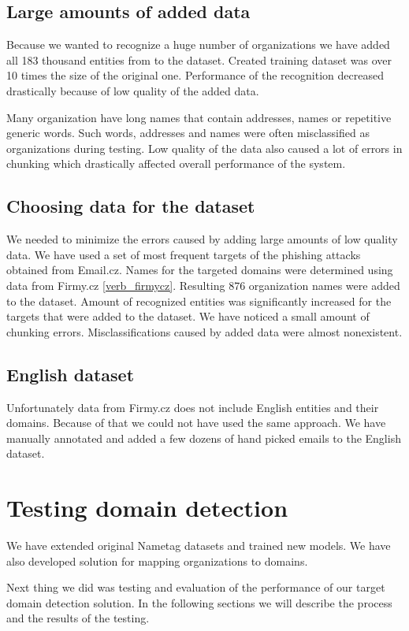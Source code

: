 \documentclass[thesis=B,english]{FITthesis}[2012/10/20]
\begin{document}
\subsection{Large amounts of added data}
Because we wanted to recognize a huge number of organizations we have added all 183 thousand entities from \cite{opendata_orgs} to the dataset.
Created training dataset was over 10 times the size of the original one.
Performance of the recognition decreased drastically because of low quality of the added data.

Many organization have long names that contain addresses, names or repetitive generic words. 
Such words, addresses and names were often misclassified as organizations during testing.
Low quality of the data also caused a lot of errors in chunking which drastically affected overall performance of the system.


\subsection{Choosing data for the dataset}
We needed to minimize the errors caused by adding large amounts of low quality data.
We have used a set of most frequent targets of the phishing attacks obtained from Email.cz.
Names for the targeted domains were determined using data from Firmy.cz \ref{verb_firmycz}.
Resulting 876 organization names were added to the dataset. 
Amount of recognized entities was significantly increased for the targets that were added to the dataset.
We have noticed a small amount of chunking errors. Misclassifications caused by added data were almost nonexistent. 

\subsection{English dataset}
Unfortunately data from Firmy.cz does not include English entities and their domains.
Because of that we could not have used the same approach.
We have manually annotated and added a few dozens of hand picked emails to the English dataset.


\section{Testing domain detection}
We have extended original Nametag datasets and trained new models. 
We have also developed solution for mapping organizations to domains.
\par Next thing we did was testing and evaluation of the performance of our target domain detection solution. 
In the following sections we will describe the process and the results of the testing.
\end{document}
